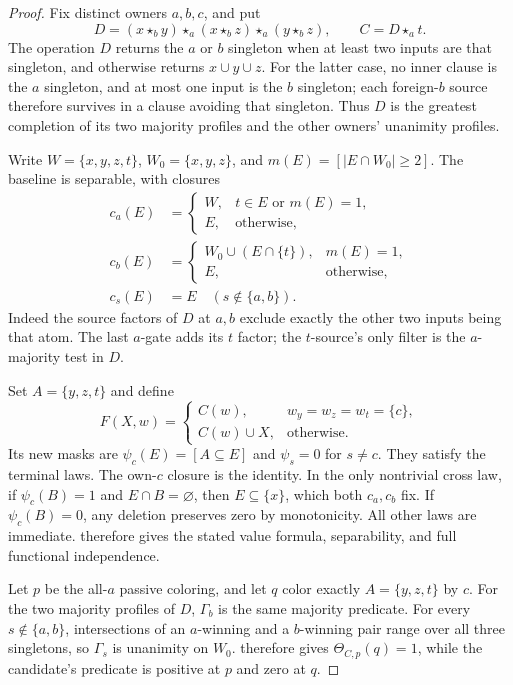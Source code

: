 \begin{proof}
Fix distinct owners $a,b,c$, and put
\[
 D=(x\star_b y)\star_a(x\star_b z)\star_a(y\star_b z),
 \qquad C=D\star_a t.
\]
The operation $D$ returns the $a$ or $b$ singleton when at least two
inputs are that singleton, and otherwise returns $x\cup y\cup z$.
For the latter case, no inner clause is the $a$ singleton, and at
most one input is the $b$ singleton; each foreign-$b$ source therefore
survives in a clause avoiding that singleton. Thus $D$ is the greatest
completion of its two majority profiles and the other owners' unanimity
profiles.

Write $W=\{x,y,z,t\}$, $W_0=\{x,y,z\}$, and
$m(E)=[|E\cap W_0|\geq2]$. The baseline is separable, with closures
\[
 \begin{aligned}
 c_a(E)&=\begin{cases}W,&t\in E\text{ or }m(E)=1,\\E,&\text{otherwise},\end{cases}\\
 c_b(E)&=\begin{cases}W_0\cup(E\cap\{t\}),&m(E)=1,\\E,&\text{otherwise},\end{cases}\\
 c_s(E)&=E\quad(s\notin\{a,b\}).
 \end{aligned}
\]
Indeed the source factors of $D$ at $a,b$ exclude exactly the other
two inputs being that atom. The last $a$-gate adds its $t$ factor;
the $t$-source's only filter is the $a$-majority test in $D$.

Set $A=\{y,z,t\}$ and define
\[
 F(X,w)=\begin{cases}
 C(w),&w_y=w_z=w_t=\{c\},\\
 C(w)\cup X,&\text{otherwise}.
 \end{cases}
\]
Its new masks are $\psi_c(E)=[A\subseteq E]$ and $\psi_s=0$
for $s\ne c$. They satisfy the terminal laws. The own-$c$ closure
is the identity. In the only nontrivial cross law, if
$\psi_c(B)=1$ and $E\cap B=\varnothing$, then
$E\subseteq\{x\}$, which both $c_a,c_b$ fix. If $\psi_c(B)=0$,
any deletion preserves zero by monotonicity. All other laws are
immediate.  therefore gives the
stated value formula, separability, and full functional independence.

Let $p$ be the all-$a$ passive coloring, and let $q$ color exactly
$A=\{y,z,t\}$ by $c$. For the two majority profiles of $D$,
$\Gamma_b$ is the same majority predicate. For every
$s\notin\{a,b\}$, intersections of an $a$-winning and a $b$-winning
pair range over all three singletons, so $\Gamma_s$ is unanimity on
$W_0$.  therefore gives
$\Theta_{C,p}(q)=1$, while the candidate's predicate is positive at
$p$ and zero at $q$.


\end{proof}
